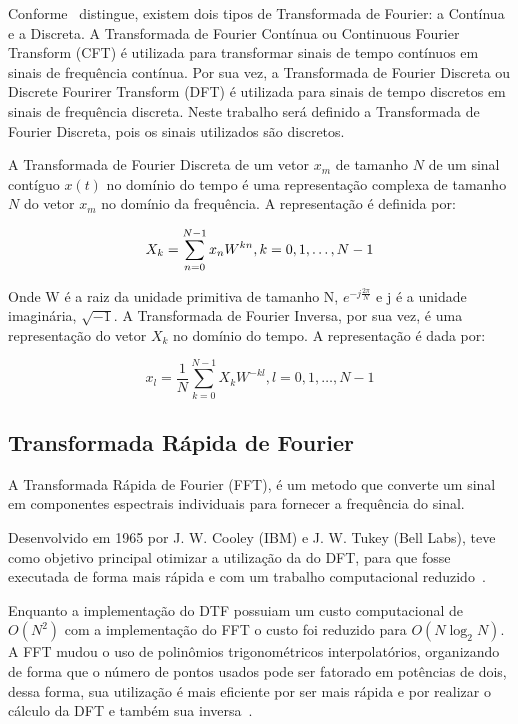 \documentclass{sbrt}
\begin{document}
Conforme~\cite{richardson1978fundamentals} distingue, existem dois tipos de Transformada de Fourier: a Contínua e a Discreta. A Transformada de Fourier Contínua ou Continuous Fourier Transform (CFT) é utilizada para transformar sinais de tempo contínuos em sinais de frequência contínua. Por sua vez, a Transformada de Fourier Discreta ou Discrete Fourirer Transform (DFT) é utilizada para sinais de tempo discretos em sinais de frequência discreta. Neste trabalho será definido a Transformada de Fourier Discreta, pois os sinais utilizados são discretos.

A Transformada de Fourier Discreta de um vetor $x_m$ de tamanho $N$ de um sinal contíguo $x(t)$ no domínio do tempo é uma representação complexa de tamanho $N$ do vetor $x_m$ no domínio da frequência. A representação é definida por:

\begin{equation} \label{eq:fourier}
  {X_k} = \sum_{n=0}^{N-1} x_n W^{kn}, k = 0, 1, \dots, N-1 \\
\end{equation}

Onde W é a raiz da unidade primitiva de tamanho N, $e^{-j \frac{2\pi}{N}}$ e j é a unidade imaginária, $\sqrt{-1}$. A Transformada de Fourier Inversa, por sua vez, é uma representação do vetor $X_k$ no domínio do tempo. A representação é dada por:

\begin{equation} \label{eq:fourier_inv}
  x_l = \frac{1}{N} \sum_{k=0}^{N-1} {X_k} W^{-kl}, l = 0, 1, \dots, N-1
\end{equation}

\subsection{Transformada Rápida de Fourier}

A Transformada Rápida de Fourier (FFT), é um metodo que  converte um sinal em componentes espectrais individuais para fornecer a frequência do sinal.

Desenvolvido em 1965 por  J. W. Cooley (IBM) e J. W. Tukey (Bell Labs), teve como objetivo principal otimizar a utilização da do DFT, para que fosse executada de forma mais rápida e com um trabalho computacional reduzido~\cite{martins2016analise}.

Enquanto a implementação do DTF possuiam um custo computacional de $O(N^2)$ com a implementação do FFT o custo foi
reduzido para $O(N \log_2{N})$. A FFT mudou o uso de polinômios trigonométricos interpolatórios, organizando de forma
que o número de pontos usados pode ser fatorado em potências de dois, dessa forma, sua utilização é mais eficiente por
ser mais rápida e por realizar o cálculo da DFT e também sua inversa~\cite{reis2008implementaccao}.
\end{document}
